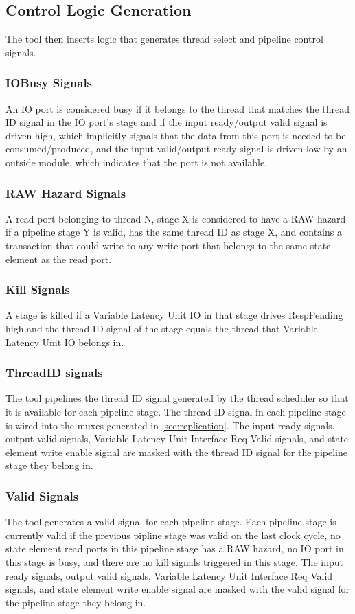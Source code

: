 \subsection{Control Logic Generation}
The tool then inserts logic that generates thread select and pipeline control signals. 

\subsubsection{IOBusy Signals}
An IO port is considered busy if it belongs to the thread that matches the thread ID signal in the IO port's stage and if the input ready/output valid signal is driven high, which implicitly signals that the data from this port is needed to be consumed/produced, and the input valid/output ready signal is driven low by an outside module, which indicates that the port is not available.

\subsubsection{RAW Hazard Signals}
A read port belonging to thread N, stage X is considered to have a RAW hazard if a pipeline stage Y is valid, has the same thread ID as stage X, and contains a transaction that could write to any write port that belongs to the same state element as the read port.

\subsubsection{Kill Signals}
A stage is killed if a Variable Latency Unit IO in that stage drives RespPending high and the thread ID signal of the stage equals the thread that Variable Latency Unit IO belongs in.

\subsubsection{ThreadID signals}
The tool pipelines the thread ID signal generated by the thread scheduler so that it is available for each pipeline stage. The thread ID signal in each pipeline stage is wired into the muxes generated in \ref{sec:replication}. The input ready signals, output valid signals, Variable Latency Unit Interface Req Valid signals, and state element write enable signal are masked with the thread ID signal for the pipeline stage they belong in.

\subsubsection{Valid Signals}
The tool generates a valid signal for each pipeline stage. Each pipeline stage is currently valid if the previous pipline stage was valid on the last clock cycle, no state element read ports in this pipeline stage has a RAW hazard, no IO port in this stage is busy, and there are no kill signals triggered in this stage. The input ready signals, output valid signals, Variable Latency Unit Interface Req Valid signals, and state element write enable signal are masked with the valid signal for the pipeline stage they belong in.

